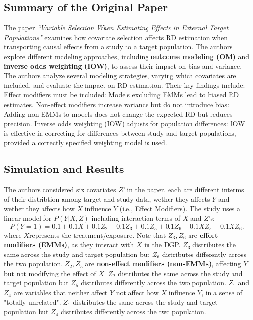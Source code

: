 \documentclass[12pt, oneside]{amsart}
\theoremstyle{definition}
\theoremstyle{remark}
\numberwithin{equation}{section}
\begin{document}
\subsection{Summary of the Original Paper}
The paper \textit{``Variable Selection When Estimating Effects in External Target Populations''} examines how covariate selection affects RD estimation when transporting causal effects from a study to a target population. The authors explore different modeling approaches, including \textbf{outcome modeling (OM)} and \textbf{inverse odds weighting (IOW)}, to assess their impact on bias and variance.\\

The authors analyze several modeling strategies, varying which covariates are included, and evaluate the impact on RD estimation. Their key findings include:
Effect modifiers must be included: Models excluding EMMs lead to biased RD estimates. Non-effect modifiers increase variance but do not introduce bias: Adding non-EMMs to models does not change the expected RD but reduces precision. Inverse odds weighting (IOW) adjusts for population differences: IOW is effective in correcting for differences between study and target populations, provided a correctly specified weighting model is used.


\subsection{Simulation and Results}
The authors considered six covariates $Z$' in the paper, each are different interms of their distribtion among target and study data, wether they affects $Y$ and wether they affects how $X$ influence $Y$ (i.e., Effect Modifiers). 
The study uses a linear model for $P(Y|X, Z)$ including interaction terms of $X$ and $Z$'s:
\begin{equation}
    P(Y = 1) = 0.1 + 0.1 X + 0.1 Z_2 + 0.1 Z_3 + 0.1 Z_5 + 0.1 Z_6 + 0.1 X Z_3 + 0.1 X Z_6.
\end{equation}
where $X$represents the treatment/exposure. Note that $Z_3, Z_6$ are \textbf{effect modifiers (EMMs)}, as they interact with $X$ in the DGP. $Z_3$ distributes the same across the study and target population but $Z_6$ distributes differently across the two population. $Z_2, Z_5$ are \textbf{non-effect modifiers (non-EMMs)}, affecting $Y$ but not modifying the effect of $X$. $Z_2$ distributes the same across the study and target population but $Z_5$ distributes differently across the two population. $Z_1$ and $Z_4$ are variables that neither affect $Y$ not affect how $X$ influence $Y$, in a sense of "totally unrelated". $Z_1$ distributes the same across the study and target population but $Z_4$ distributes differently across the two population. \\
\end{document}
